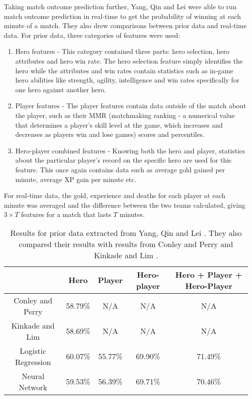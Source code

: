 \documentclass[Report.tex]{subfiles}
\begin{document}
Taking match outcome prediction further, Yang, Qin and Lei \cite{dota-yang} were able to run match outcome prediction in real-time to get the probability of winning at each minute of a match. They also drew comparisons between prior data and real-time data. For prior data, three categories of features were used:
\begin{enumerate}
\item Hero features - This category contained three parts: hero selection, hero attributes and hero win rate. The hero selection feature simply identifies the hero while the attributes and win rates contain statistics such as in-game hero abilities like strength, agility, intelligence and win rates specifically for one hero against another hero.
\item Player features - The player features contain data outside of the match about the player, such as their MMR (matchmaking ranking - a numerical value that determines a player's skill level at the game, which increases and decreases as players win and lose games) scores and percentiles.
\item Hero-player combined features - Knowing both the hero and player, statistics about the particular player's record on the specific hero are used for this feature. This once again contains data such as average gold gained per minute, average XP gain per minute etc. 
\end{enumerate}
For real-time data, the gold, experience and deaths for each player at each minute was averaged and the difference between the two teams calculated, giving $3 \times T$ features for a match that lasts $T$ minutes. 
\begin{table}[H]
\centering
\begin{tabular}{| c | c | c | c | c |}
\hline
 & \textbf{Hero} & \textbf{Player} & \textbf{Hero-player} & \textbf{Hero + Player + Hero-Player} \\ \hline
 Conley and Perry \cite{dota-conley} & 58.79\% & N/A & N/A & N/A \\ \hline
 Kinkade and Lim \cite{dota-kinkade} & 58.69\% & N/A & N/A & N/A \\ \hline
 Logistic Regression & 60.07\% & 55.77\% & 69.90\% & 71.49\% \\ \hline
 Neural Network & 59.53\% & 56.39\% & 69.71\% & 70.46\% \\ \hline
\end{tabular}
\caption{Results for prior data extracted from Yang, Qin and Lei \cite{dota-yang}. They also compared their results with results from Conley and Perry \cite{dota-conley} and Kinkade and Lim \cite{dota-kinkade}.}
\end{table}
\end{document}
